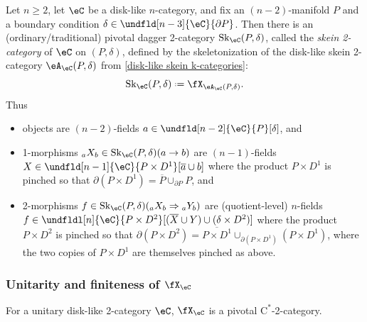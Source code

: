 \documentclass[12pt,reqno]{amsart}
\newcommand{\Sk}{\mathrm{Sk}}
\newcommand{\A}{\eA}
\newcommand{\C}{\eC}
\newcommand{\bdy}{\partial}
\newcommand{\fcj}[1]{\overline{#1}}
\newcommand{\orev}{\overline}
\newcommand{\Cstar}{\ensuremath{\mathrm{C}^{*}}}
\newcommand{\defn}[1]{\emph{#1}}
\DeclareRobustCommand{\coloneq}{\mathrel{\vcenter{\baselineskip0.5ex\lineskiplimit0pt\hbox{\scriptsize{\upshape.}}\hbox{\scriptsize{\upshape.}}}}=}
\begin{document}
\begin{example}
\label{skein 2-category}
Let $n\geq 2$, let $\C$ be a disk-like $n$-category, and fix an $(n-2)$-manifold $P$ and a boundary condition $\delta\in\undfld[n-3]{\C}{\bdy P}$. Then there is an (ordinary/traditional) pivotal dagger 2-category $\Sk_\C(P,\delta)$, called the \defn{skein 2-category} of $\C$ on $(P,\delta)$, defined by the skeletonization of the disk-like skein 2-category $\A_\C(P,\delta)$ from \cref{disk-like skein k-categories}:
\[
\Sk_\C(P,\delta)\coloneq\fX_{\A_\C(P,\delta)}.
\]
Thus
\begin{itemize}
    \item objects are $(n-2)$-fields $a\in\undfld[n-2]{\C}{P}[\delta]$, and
    \item 1-morphisms ${}_aX_b\in\Sk_\C(P,\delta)(a\to b)$ are $(n-1)$-fields $X\in\undfld[n-1]{\C}{P\times D^1}[\fcj a\cup b]$
    where the product $P\times D^1$ is pinched so that $\partial (P\times D^1)=\orev{P}\cup_{\partial P}P$, and
    \item 2-morphisms $f\in\Sk_\C(P,\delta)({}_aX_b\Rightarrow {}_aY_b)$ are (quotient-level) $n$-fields $f\in\undfldl[n]{\C}{P\times D^2}[(\fcj X\cup Y)\cup(\delta\times D^2)]$ 
    where the product $P\times D^2$ is pinched so that $\partial (P\times D^2)=\orev{P\times D^1}\cup_{\partial (P\times D^1)}(P\times D^1)$, where the two copies of $P\times D^1$ are themselves pinched as above.
\end{itemize}
\end{example}

\subsubsection{Unitarity and finiteness of \texorpdfstring{$\fX_\C$}{X(C)}}

\begin{lemma}
\label{lemXCunitary}
For a unitary disk-like 2-category $\C$, $\fX_\C$ is a pivotal $\Cstar$-2-category.
\end{lemma}
\end{document}
